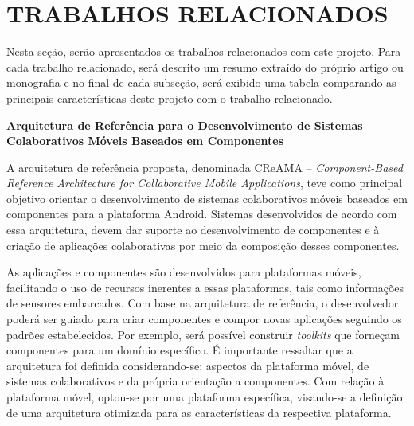 
\section{TRABALHOS RELACIONADOS}
Nesta seção, serão apresentados os trabalhos relacionados com este projeto. Para cada trabalho relacionado, será descrito um resumo extraído do próprio artigo ou monografia e no final de cada subseção, será exibido uma tabela comparando as principais características deste projeto com o trabalho relacionado.\par

\textbf{Arquitetura de Referência para o Desenvolvimento de Sistemas Colaborativos Móveis Baseados em Componentes} \cite{melotti_2014}
\par
A arquitetura de referência proposta, denominada CReAMA – \textit{Component-Based Reference Architecture for Collaborative Mobile Applications}, teve como principal objetivo orientar o desenvolvimento de sistemas colaborativos móveis baseados em componentes para a plataforma Android. Sistemas desenvolvidos de acordo com essa arquitetura, devem dar suporte ao desenvolvimento de componentes e à criação de aplicações colaborativas por meio da composição desses componentes.\par
As aplicações e componentes são desenvolvidos para plataformas móveis, facilitando o uso de recursos inerentes a essas plataformas, tais como informações de sensores embarcados. Com base na arquitetura de referência, o desenvolvedor poderá ser guiado para criar componentes e compor novas aplicações seguindo os padrões estabelecidos. Por exemplo, será possível construir \textit{toolkits} que forneçam componentes para um domínio específico. É importante ressaltar que a arquitetura foi definida considerando-se: aspectos da plataforma móvel, de sistemas colaborativos e da própria orientação a componentes. Com relação à plataforma móvel, optou-se por uma plataforma específica, visando-se a definição de uma arquitetura otimizada para as características da respectiva plataforma.\par

